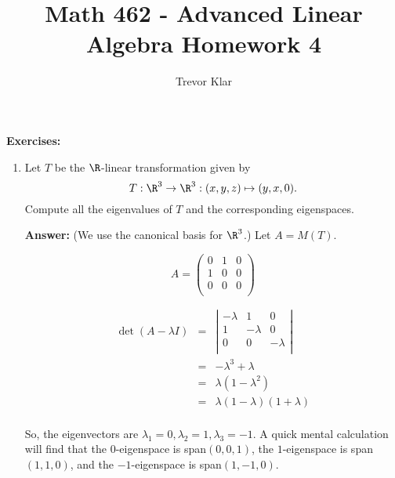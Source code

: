 \documentclass[letterpaper]{article}
\title{Math 462 - Advanced Linear Algebra \linebreak
	Homework 4}
\author{Trevor Klar}
\begin{document}
\maketitle

\noindent \textbf{Exercises:}
\begin{enumerate}
\item Let $T$ be the $\R$-linear transformation given by 
$$T : \R^3\to\R^3 : (x,y,z)\mapsto(y,x,0).$$
Compute all the eigenvalues of $T$ and the corresponding eigenspaces.

\textbf{Answer:}
(We use the canonical basis for $\R^3$.) Let $A=M(T)$.

\[A = \left(
\begin{array}{ccc}
0 & 1 & 0 \\
1 & 0 & 0 \\
0 & 0 & 0 \\
\end{array}\right)\]

\[\begin{array}{rcl}
\det(A-\lambda I)&=&\left| 
\begin{array}{ccc}
-\lambda & 1 & 0 \\
1 & -\lambda & 0 \\
0 & 0 & -\lambda \\
\end{array}\right|\\
&=& -\lambda^3+\lambda\\
&=& \lambda(1-\lambda^2)\\
&=& \lambda(1-\lambda)(1+\lambda)\\
\end{array}\]

So, the eigenvectors are $\lambda_1=0, \lambda_2=1, \lambda_3=-1$. A quick mental calculation will find that the $0$-eigenspace is span$(0,0,1)$, the $1$-eigenspace is span$(1,1,0)$, and the $-1$-eigenspace is span$(1,-1,0)$. 



\end{enumerate}
\end{document}
